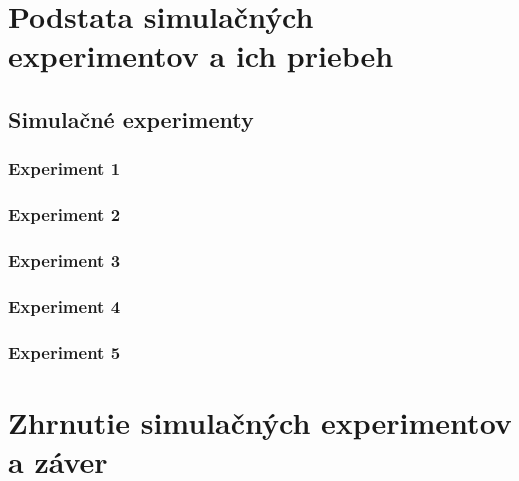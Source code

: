 \documentclass[a4paper, 11pt]{article}
\begin{document}
\section{Podstata simulačných experimentov a ich priebeh}



\subsection{Simulačné experimenty}

\subsubsection{Experiment 1}



\subsubsection{Experiment 2}



\subsubsection{Experiment 3}



\subsubsection{Experiment 4}



\subsubsection{Experiment 5}


\pagebreak
\section{Zhrnutie simulačných experimentov a záver}



\clearpage

\renewcommand{\refname}{Literatúra}

\end{document}
